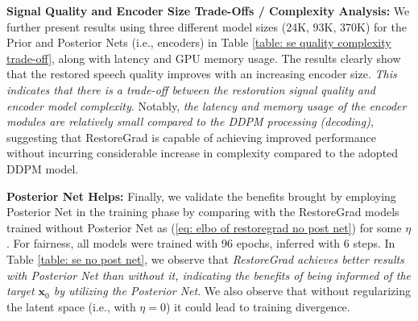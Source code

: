 \noindent\textbf{Signal Quality and Encoder Size Trade-Offs / Complexity Analysis:} We further present results using three different model sizes (24K, 93K, 370K) for the Prior and Posterior Nets (i.e., encoders) in Table \ref{table: se quality complexity trade-off}, along with latency and GPU memory usage. The results clearly show that the restored speech quality improves with an increasing encoder size. \textit{This indicates that there is a trade-off between the restoration signal quality and encoder model complexity}. Notably, \textit{the latency and memory usage of the encoder modules are relatively small compared to the DDPM processing (decoding)}, suggesting that RestoreGrad is capable of achieving improved performance without incurring considerable increase in complexity compared to the adopted DDPM model.

\textbf{Posterior Net Helps:} Finally, we validate the benefits brought by employing Posterior Net in the training phase by comparing with the RestoreGrad models trained without Posterior Net as (\ref{eq: elbo of restoregrad no post net}) for some $\eta$. For fairness, all models were trained with 96 epochs, inferred with 6 steps. In Table \ref{table: se no post net}, we observe that \textit{RestoreGrad achieves better results with Posterior Net than without it, indicating the benefits of being informed of the target $\mathbf{x}_0$ by utilizing the Posterior Net}. We also observe that without regularizing the latent space (i.e., with $\eta=0$) it could lead to training divergence.

